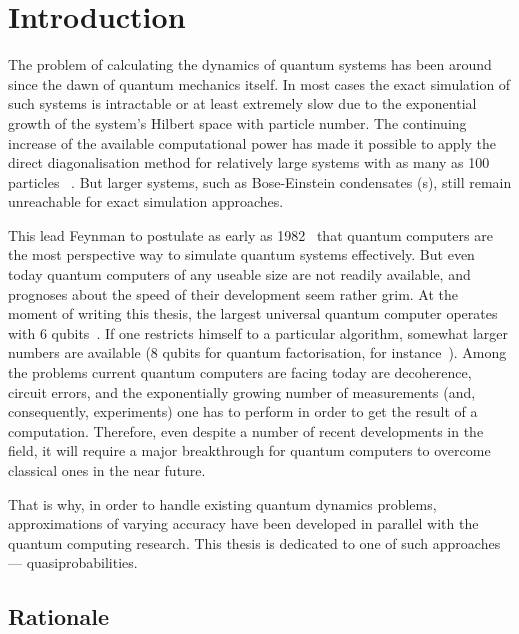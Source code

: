 \chapter{Introduction}

The problem of calculating the dynamics of quantum systems has been around since the dawn of quantum mechanics itself.
In most cases the exact simulation of such systems is intractable or at least extremely slow due to the exponential growth of the system's Hilbert space with particle number.
The continuing increase of the available computational power has made it possible to apply the direct diagonalisation method for relatively large systems with as many as 100 particles~\cite{Sakmann2009} .
But larger systems, such as Bose-Einstein condensates (s), still remain unreachable for exact simulation approaches.

This lead Feynman to postulate as early as 1982~\cite{Feynman1982} that quantum computers are the most perspective way to simulate quantum systems effectively.
But even today quantum computers of any useable size are not readily available, and prognoses about the speed of their development seem rather grim.
At the moment of writing this thesis, the largest universal quantum computer operates with 6 qubits~\cite{Lanyon2011}.
If one restricts himself to a particular algorithm, somewhat larger numbers are available (8 qubits for quantum factorisation, for instance~\cite{Xu2012}).
Among the problems current quantum computers are facing today are decoherence, circuit errors, and the exponentially growing number of measurements (and, consequently, experiments) one has to perform in order to get the result of a computation.
Therefore, even despite a number of recent developments in the field, it will require a major breakthrough for quantum computers to overcome classical ones in the near future.

That is why, in order to handle existing quantum dynamics problems, approximations of varying accuracy have been developed in parallel with the quantum computing research.
This thesis is dedicated to one of such approaches --- quasiprobabilities.


\section{Rationale}

